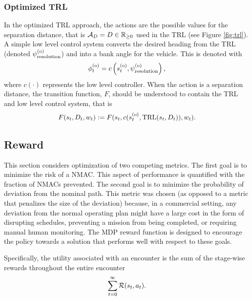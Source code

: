 \subsubsection{Optimized TRL}

In the optimized TRL approach, the actions are the possible values for the separation distance, that is ${\mathcal{A}}_{D} = D\in \mathbb{R}_{\geq 0}$ used in the TRL (see Figure \ref{fig:trl}).
A simple low level control system converts the desired heading from the TRL (denoted $\psi^{(\mathrm{o})}_\mathrm{resolution}$) and into a bank angle for the vehicle.
This is denoted with
\begin{equation}
    \phi^{(\mathrm{o})}_t = c\left(s^{(\mathrm{o})}_t, \psi^{(\mathrm{o})}_\mathrm{resolution} \right) \text{,}
\end{equation}
where $c(\cdot)$ represents the low level controller.
When the action is a separation distance, the transition function, $F$, should be understood to contain the TRL and low level control system, that is
\begin{equation}
    F(s_t, D_t, w_t) := F(s_t, c(s^{(\mathrm{o})}_t, \text{TRL}(s_t, D_t)), w_t) \text{.}
\end{equation}

\subsection{Reward}\label{sec:rew}

This section considers optimization of two competing metrics. The first goal is to minimize the risk of a NMAC. This aspect of performance is quantified with the fraction of NMACs prevented. The second goal is to minimize the probability of deviation from the nominal path. This metric was chosen (as opposed to a metric that penalizes the size of the deviation) because, in a commercial setting, any deviation from the normal operating plan might have a large cost in the form of disrupting schedules, preventing a mission from being completed, or requiring manual human monitoring. The MDP reward function is designed to encourage the policy towards a solution that performs well with respect to these goals.  

Specifically, the utility associated with an encounter is the sum of the stage-wise rewards throughout  the entire encounter
\begin{equation}\label{eqn:encrew}
    \sum_{t=0}^\infty \mathcal{R}(s_t, a_t) \text{.}
\end{equation}

